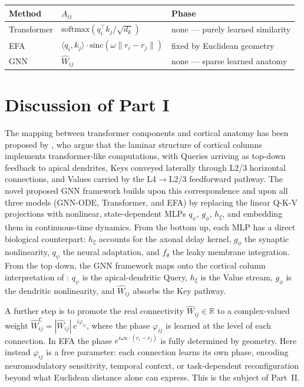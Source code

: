 \documentclass[11pt]{article}
\begin{document}
\begin{center}
\begin{tabular}{lll}
\toprule
Method & $A_{ij}$ & Phase \\
\midrule
Transformer & $\mathrm{softmax}(q_i^\top k_j/\sqrt{d_k})$ &
  none --- purely learned similarity \\
EFA \citep{frank2026efa} &
  $\langle q_i, k_j\rangle \cdot \mathrm{sinc}(\omega\|r_i-r_j\|)$ &
  fixed by Euclidean geometry \\
GNN & $\hat{W}_{ij}$ &
  none --- sparse learned anatomy \\
\bottomrule
\end{tabular}
\end{center}


\section{Discussion of Part I}
The mapping between transformer components and cortical anatomy
has been proposed by \citet{konig2026}, who argue that the laminar
structure of cortical columns implements transformer-like
computations, with Queries arriving as top-down feedback to apical
dendrites, Keys conveyed laterally through L2/3 horizontal
connections, and Values carried by the L4$\to$L2/3 feedforward
pathway. The novel proposed GNN framework builds upon this
correspondence and upon all three models (GNN-ODE, Transformer,
and EFA) by replacing the linear Q-K-V projections with
nonlinear, state-dependent MLPs $q_\psi$, $g_\phi$, $h_\xi$,
and embedding them in continuous-time dynamics. From the bottom
up, each MLP has a direct biological counterpart: $h_\xi$ accounts
for the axonal delay kernel, $g_\phi$ the synaptic nonlinearity,
$q_\psi$ the neural adaptation, and $f_\theta$ the leaky membrane
integration. From the top down, the GNN framework maps onto the
cortical column interpretation of \citet{konig2026}: $q_\psi$ is
the apical-dendritic Query, $h_\xi$ is the Value stream, $g_\phi$
is the dendritic nonlinearity, and $\hat{W}_{ij}$ absorbs the
Key pathway.

A further step is to promote the real connectivity $\hat{W}_{ij} \in \mathbb{R}$ to a complex-valued weight $\hat{W}_{ij}^{\mathbb{C}} =
|\hat{W}_{ij}|\,e^{i\varphi_{ij}}$, where the phase $\varphi_{ij}$
is learned at the level of each connection. In EFA the phase
$e^{i\omega u \cdot (r_i - r_j)}$ is fully determined by geometry.
Here instead $\varphi_{ij}$ is a free parameter: each connection
learns its own phase, encoding neuromodulatory sensitivity, temporal
context, or task-dependent reconfiguration beyond what Euclidean
distance alone can express. This is the subject of Part~II.
\end{document}
